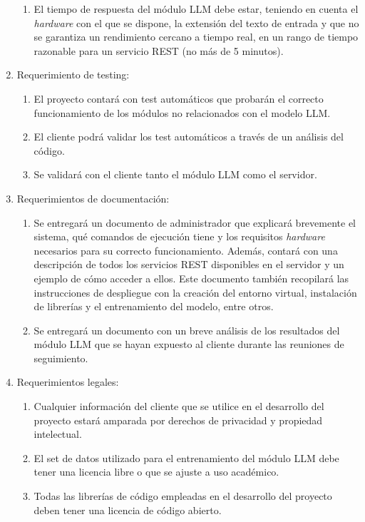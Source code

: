 \documentclass[
11pt, %
]{Clases/charter}
\begin{document}
\begin{enumerate}
\begin{enumerate}
		      \item El tiempo de respuesta del módulo LLM debe estar, teniendo en cuenta el \textit{hardware} con el que se dispone, la extensión del texto de entrada y que no se garantiza un rendimiento cercano a tiempo real,
		            en un rango de tiempo razonable para un servicio REST (no más de 5 minutos).
	      \end{enumerate}
	\item Requerimiento de testing:
	      \begin{enumerate}
		      \item El proyecto contará con test automáticos que probarán el correcto funcionamiento de los módulos no relacionados con el modelo LLM.
		      \item El cliente podrá validar los test automáticos a través de un análisis del código.
		      \item Se validará con el cliente tanto el módulo LLM como el servidor.
	      \end{enumerate}
	\item Requerimientos de documentación:
	      \begin{enumerate}
		      \item Se entregará un documento de administrador que explicará brevemente el sistema, qué comandos de ejecución tiene y los requisitos \textit{hardware} necesarios para su correcto funcionamiento.
		            Además, contará con una descripción de todos los servicios REST disponibles en el servidor y un ejemplo de cómo acceder a ellos.
		            Este documento también recopilará las instrucciones de despliegue con la creación del entorno virtual, instalación de librerías y el entrenamiento del modelo, entre otros.
		      \item Se entregará un documento con un breve análisis de los resultados del módulo LLM que se hayan expuesto al cliente durante las reuniones de seguimiento.
	      \end{enumerate}
	\item Requerimientos legales:
	      \begin{enumerate}
		      \item Cualquier información del cliente que se utilice en el desarrollo del proyecto estará amparada por derechos de privacidad y propiedad intelectual.
		      \item El set de datos utilizado para el entrenamiento del módulo LLM debe tener una licencia libre o que se ajuste a uso académico.
		      \item Todas las librerías de código empleadas en el desarrollo del proyecto deben tener una licencia de código abierto.
	      \end{enumerate}
\end{enumerate}
\end{document}
